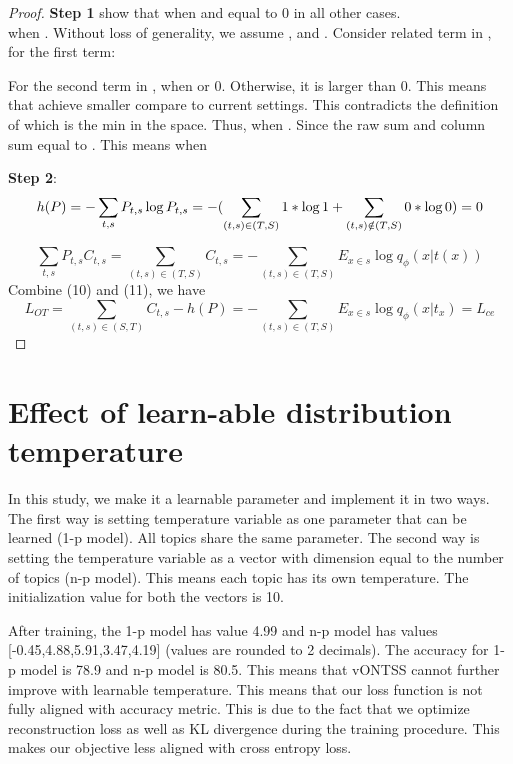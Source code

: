 \documentclass[11pt]{article}
\begin{document}
\begin{proof}
\textbf{Step 1} show that  when  and equal to 0 in all other cases.\\ 
 when . Without loss of generality, we assume  ,  and . Consider related term in , for the first term: 

  For the second term in ,  when  or 0. Otherwise, it is larger than 0. This means that  achieve smaller  compare to current settings. This contradicts the definition of  which is the min in the space.  Thus,  when . Since the raw sum and column sum equal to . This means  when 


\textbf{Step 2}: 
\begin{dmath}h(P) = - \sum_{t,s} P_{t,s} \log P_{t,s} \\
 = - (\sum_{(t, s) \in (T,S)} 1 * \log 1 + \sum_{(t, s) \notin (T,S)} 0 * \log 0)  = 0 \end{dmath}
 
 
\begin{dmath}\sum_{t,s} P_{t,s} C_{t, s} = \sum_{(t, s) \in (T, S)} C_{t, s} 
=- \sum_{(t, s) \in (T, S)} E_{x\in s} \log q_{\phi}(x|t(x)) \end{dmath}
Combine (10) and (11), we have \begin{dmath}L_{OT} = \sum_{(t,s)\in(S, T)}  C_{t, s} - h(P)= - \sum_{(t,s) \in (T, S)} E_{x \in s} \log q_{\phi}(x|t_{x})  
= L_{ce} \end{dmath}

\end{proof}


\section{Effect of learn-able distribution temperature}
\label{appendix:temperature}
In this study, we make it a learnable parameter and implement it in two ways. The first way is setting temperature variable as one parameter that can be learned (1-p model). All topics share the same parameter. The second way is setting the temperature variable as a vector with dimension equal to the number of topics (n-p model). This means each topic has its own temperature. The initialization value for both the vectors is 10.

After training, the 1-p model has value 4.99 and n-p model has values [-0.45,4.88,5.91,3.47,4.19] (values are rounded to 2 decimals). The accuracy for 1-p model is 78.9 and n-p model is 80.5. This means that vONTSS cannot further improve with learnable temperature. This means that our loss function is not fully aligned with accuracy metric. This is due to the fact that we optimize reconstruction loss as well as KL divergence during the training procedure. This makes our objective less aligned with cross entropy loss.
\end{document}
